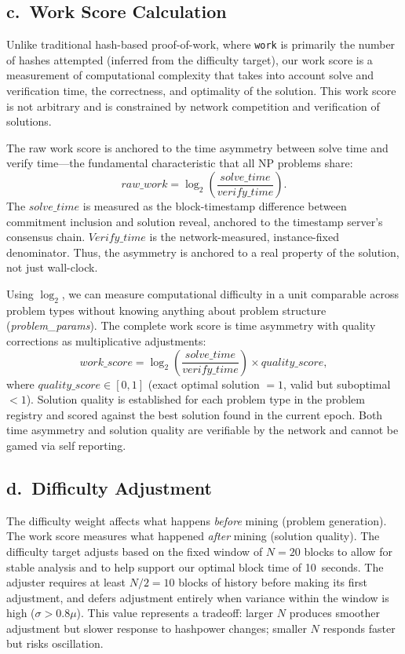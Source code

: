 \documentclass[12pt,letterpaper]{article}
\begin{document}
\subsection*{c.\ Work Score Calculation}

Unlike traditional hash-based proof-of-work, where \texttt{work} is primarily the number of hashes attempted
(inferred from the difficulty target), our work score is a measurement of computational complexity that
takes into account solve and verification time, the correctness, and optimality of the solution. This work
score is not arbitrary and is constrained by network competition and verification of solutions.

The raw work score is anchored to the time asymmetry between solve time and verify time---the
fundamental characteristic that all NP problems share:
\[
  \mathit{raw\_work} = \log_2\!\left(\frac{\mathit{solve\_time}}{\mathit{verify\_time}}\right).
\]
The $\mathit{solve\_time}$ is measured as the block-timestamp difference between commitment inclusion
and solution reveal, anchored to the timestamp server's consensus chain. $\mathit{Verify\_time}$ is the
network-measured, instance-fixed denominator. Thus, the asymmetry is anchored to a real property of the
solution, not just wall-clock.

Using $\log_2$, we can measure computational difficulty in a unit comparable across problem types
without knowing anything about problem structure (\textit{problem\_params}). The complete work score
is time asymmetry with quality corrections as multiplicative adjustments:
\[
  \mathit{work\_score} = \log_2\!\left(\frac{\mathit{solve\_time}}{\mathit{verify\_time}}\right)
                         \times \mathit{quality\_score},
\]
where $\mathit{quality\_score} \in [0,1]$ (exact optimal solution $= 1$, valid but suboptimal $<1$).
Solution quality is established for each problem type in the problem registry and scored against the best
solution found in the current epoch. Both time asymmetry and solution quality are verifiable by the
network and cannot be gamed via self reporting.

\subsection*{d.\ Difficulty Adjustment}

The difficulty weight affects what happens \emph{before} mining (problem generation). The work score
measures what happened \emph{after} mining (solution quality). The difficulty target adjusts based on
the fixed window of $N = 20$ blocks to allow for stable analysis and to help support our optimal block
time of 10~seconds. The adjuster requires at least $N/2 = 10$ blocks of history before making its first
adjustment, and defers adjustment entirely when variance within the window is high ($\sigma > 0.8\mu$).
This value represents a tradeoff: larger $N$ produces smoother adjustment but slower response to
hashpower changes; smaller $N$ responds faster but risks oscillation.
\end{document}
